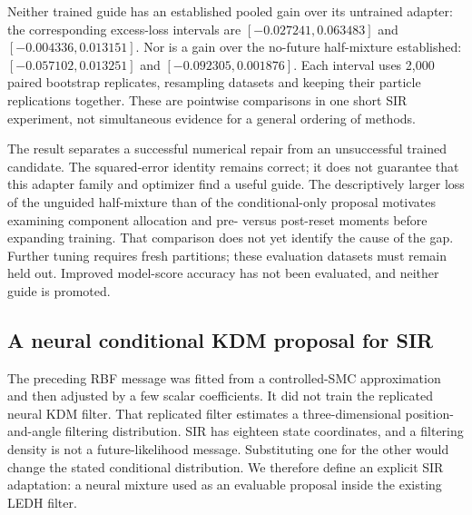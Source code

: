 Neither trained guide has an established pooled gain over its untrained
adapter: the corresponding excess-loss intervals are
\([-0.027241,0.063483]\) and \([-0.004336,0.013151]\).
Nor is a gain over the no-future half-mixture established:
\([-0.057102,0.013251]\) and \([-0.092305,0.001876]\).
Each interval uses 2,000 paired bootstrap replicates, resampling datasets
and keeping their particle replications together. These are pointwise
comparisons in one short SIR experiment, not simultaneous evidence for
a general ordering of methods.

The result separates a successful numerical repair from an unsuccessful
trained candidate. The squared-error identity remains correct; it does not
guarantee that this adapter family and optimizer find a useful guide.
The descriptively larger loss of the unguided half-mixture than of the
conditional-only proposal motivates examining component allocation and
pre- versus post-reset moments before expanding training. That comparison
does not yet identify the cause of the gap. Further tuning requires fresh
partitions; these evaluation datasets must remain held out. Improved
model-score accuracy has not been evaluated, and neither guide is promoted.

\subsection{A neural conditional KDM proposal for SIR}
\label{sec:sir-neural-kdm-adaptation}

The preceding RBF message was fitted from a controlled-SMC approximation and
then adjusted by a few scalar coefficients. It did not train the replicated
neural KDM filter. That replicated filter estimates a three-dimensional
position-and-angle filtering distribution. SIR has eighteen state coordinates,
and a filtering density is not a future-likelihood message. Substituting one
for the other would change the stated conditional distribution. We therefore
define an explicit SIR adaptation: a neural mixture used as an evaluable
proposal inside the existing LEDH filter.

